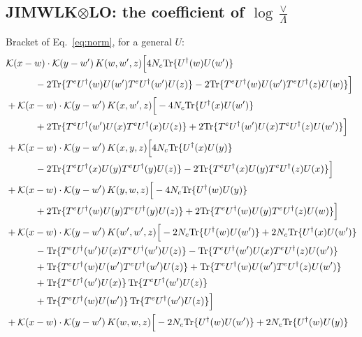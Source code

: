 \documentclass[10pt]{article}
\numberwithin{equation}{section}
\begin{document}
\subsection{JIMWLK\texorpdfstring{$\otimes$}{x}LO: the coefficient of \texorpdfstring{$\log\frac{\vee}{\Lambda}$}{log(vee/Lambda)}}
Bracket of Eq.~\eqref{eq:norm}, for a general $U$:
\begin{align}
&\mathcal K(x-w)\cdot\mathcal K(y-w')\,K(w,w',z)\Big[4 N_c{\rm Tr}\{U^\dagger(w)U(w')\}\notag\\
&\quad\quad\quad-2{\rm Tr}\{T^eU^\dagger(w)U(w')T^eU^\dagger(w')U(z)\}-2{\rm Tr}\{T^eU^\dagger(w)U(w')T^eU^\dagger(z)U(w)\}\Big]\notag\\
&+\mathcal K(x-w)\cdot\mathcal K(y-w')\,K(x,w',z)\Big[-4 N_c{\rm Tr}\{U^\dagger(x)U(w')\}\notag\\
&\quad\quad\quad+2{\rm Tr}\{T^eU^\dagger(w')U(x)T^eU^\dagger(x)U(z)\}+2{\rm Tr}\{T^eU^\dagger(w')U(x)T^eU^\dagger(z)U(w')\}\Big]\notag\\
&+\mathcal K(x-w)\cdot\mathcal K(y-w')\,K(x,y,z)\Big[4 N_c{\rm Tr}\{U^\dagger(x)U(y)\}\notag\\
&\quad\quad\quad-2{\rm Tr}\{T^eU^\dagger(x)U(y)T^eU^\dagger(y)U(z)\}-2{\rm Tr}\{T^eU^\dagger(x)U(y)T^eU^\dagger(z)U(x)\}\Big]\notag\\
&+\mathcal K(x-w)\cdot\mathcal K(y-w')\,K(y,w,z)\Big[-4 N_c{\rm Tr}\{U^\dagger(w)U(y)\}\notag\\
&\quad\quad\quad+2{\rm Tr}\{T^eU^\dagger(w)U(y)T^eU^\dagger(y)U(z)\}+2{\rm Tr}\{T^eU^\dagger(w)U(y)T^eU^\dagger(z)U(w)\}\Big]\notag\\
&+\mathcal K(x-w)\cdot\mathcal K(y-w')\,K(w',w',z)\Big[-2 N_c{\rm Tr}\{U^\dagger(w)U(w')\}+2 N_c{\rm Tr}\{U^\dagger(x)U(w')\}\notag\\
&\quad\quad\quad-{\rm Tr}\{T^eU^\dagger(w')U(x)T^eU^\dagger(w')U(z)\}-{\rm Tr}\{T^eU^\dagger(w')U(x)T^eU^\dagger(z)U(w')\}\notag\\
&\quad\quad\quad+{\rm Tr}\{T^eU^\dagger(w)U(w')T^eU^\dagger(w')U(z)\}+{\rm Tr}\{T^eU^\dagger(w)U(w')T^eU^\dagger(z)U(w')\}\notag\\
&\quad\quad\quad+{\rm Tr}\{T^eU^\dagger(w')U(x)\}\,{\rm Tr}\{T^eU^\dagger(w')U(z)\}\notag\\
&\quad\quad\quad+{\rm Tr}\{T^eU^\dagger(w)U(w')\}\,{\rm Tr}\{T^eU^\dagger(w')U(z)\}\Big]\notag\\
&+\mathcal K(x-w)\cdot\mathcal K(y-w')\,K(w,w,z)\Big[-2 N_c{\rm Tr}\{U^\dagger(w)U(w')\}+2 N_c{\rm Tr}\{U^\dagger(w)U(y)\}\notag\\

\end{align}
\end{document}
